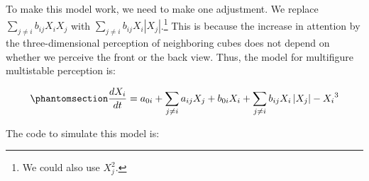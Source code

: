 \documentclass[
  a4paper,
  DIV=11,
  numbers=noendperiod,
  oneside]{scrreprt}
\begin{document}
To make this model work, we need to make one adjustment. We replace
\(\sum_{j \neq i}^{}{b_{ij}X_{i}X_{j}}\) with
\(\sum_{j \neq i}^{}{b_{ij}X_{i}|X_{j}|}\).\footnote{We could also use
  \(X_j^2\).} This is because the increase in attention by the
three-dimensional perception of neighboring cubes does not depend on
whether we perceive the front or the back view. Thus, the model for
multifigure multistable perception is:

\begin{equation}\phantomsection\label{eq-ch4n-21-old-41}{
\frac{dX_{i}}{dt} = a_{0i} + \sum_{j \neq i}^{}{a_{ij}X_{j}} + b_{0i}X_{i} + \sum_{j \neq i}^{}{b_{ij}X_{i}\left| X_{j} \right|} - {X_{i}}^{3}
}\end{equation}

The code to simulate this model is:
\end{document}
